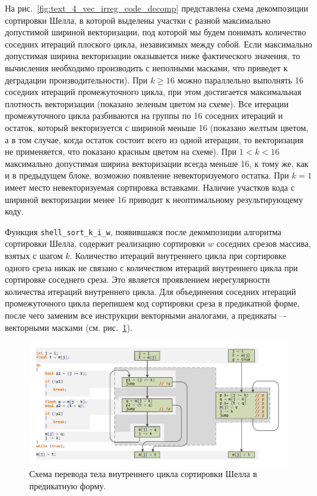 На рис.~\ref{fig:text_4_vec_irreg_code_decomp} представлена схема декомпозиции сортировки Шелла, в которой выделены участки с разной максимально допустимой шириной векторизации, под которой мы будем понимать количество соседних итераций плоского цикла, независимых между собой.
Если максимально допустимая ширина векторизации оказывается ниже фактического значения, то вычисления необходимо производить с неполными масками, что приведет к деградации производительности).
При $k \ge 16$ можно параллельно выполнять 16 соседних итераций промежуточного цикла, при этом достигается максимальная плотность векторизации (показано зеленым цветом на схеме).
Все итерации промежуточного цикла разбиваются на группы по 16 соседних итераций и остаток, который векторизуется с шириной меньше 16 (показано желтым цветом, а в том случае, когда остаток состоит всего из одной итерации, то векторизация не применяется, что показано красным цветом на схеме).
При $1 < k < 16$ максимально допустимая ширина векторизации всегда меньше 16, к тому же, как и в предыдущем блоке, возможно появление невекторизуемого остатка.
При $k = 1$ имеет место невекторизуемая сортировка вставками.
Наличие участков кода с шириной векторизации менее 16 приводит к неоптимальному результирующему коду.

Функция \texttt{shell\_sort\_k\_i\_w}, появившаяся после декомпозиции алгоритма сортировки Шелла, содержит реализацию сортировки $w$ соседних срезов массива, взятых с шагом $k$.
Количество итераций внутреннего цикла при сортировке одного среза никак не связано с количеством итераций внутреннего цикла при сортировке соседнего среза.
Это является проявлением нерегулярности количества итераций внутреннего цикла.
Для объединения соседних итераций промежуточного цикла перепишем код сортировки среза в предикатной форме, после чего заменим все инструкции векторными аналогами, а предикаты –- векторными масками (см. рис.~\ref{fig:text_4_vec_irreg_shell_cfg}).

\begin{figure}[ht]
\centering
\includegraphics[width=1.0\textwidth]{fig/vec_shell_cfg.pdf}
\singlespacing
{}\caption{Схема перевода тела внутреннего цикла сортировки Шелла в предикатную форму.}
\label{fig:text_4_vec_irreg_shell_cfg}
\end{figure}


